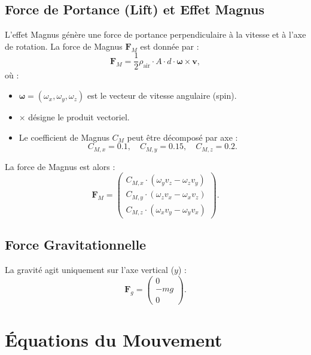 \documentclass[11pt, a4paper]{article}
\newcommand{\vb}[1]{\mathbf{#1}}       %
\begin{document}
\subsection{Force de Portance (Lift) et Effet Magnus}
L'effet Magnus génère une force de portance perpendiculaire à la vitesse et à l'axe de rotation. La force de Magnus $\vb{F}_M$ est donnée par :
\begin{equation}
    \vb{F}_M = \frac{1}{2} \rho_\text{air} \cdot A \cdot d \cdot \vb{\omega} \times \vb{v},
\end{equation}
où :
\begin{itemize}
    \item $\vb{\omega} = (\omega_x, \omega_y, \omega_z)$ est le vecteur de vitesse angulaire (spin).
    \item $\times$ désigne le produit vectoriel.
    \item Le coefficient de Magnus $C_M$ peut être décomposé par axe :
    \begin{equation}
        C_{M,x} = 0.1, \quad C_{M,y} = 0.15, \quad C_{M,z} = 0.2.
    \end{equation}
\end{itemize}
La force de Magnus est alors :
\begin{equation}
    \vb{F}_M = \begin{pmatrix}
        C_{M,x} \cdot (\omega_y v_z - \omega_z v_y) \\
        C_{M,y} \cdot (\omega_z v_x - \omega_x v_z) \\
        C_{M,z} \cdot (\omega_x v_y - \omega_y v_x)
    \end{pmatrix}.
\end{equation}

\subsection{Force Gravitationnelle}
La gravité agit uniquement sur l'axe vertical ($y$) :
\begin{equation}
    \vb{F}_g = \begin{pmatrix} 0 \\ -m g \\ 0 \end{pmatrix}.
\end{equation}


\section{Équations du Mouvement}
\label{sec:equations}
\end{document}
